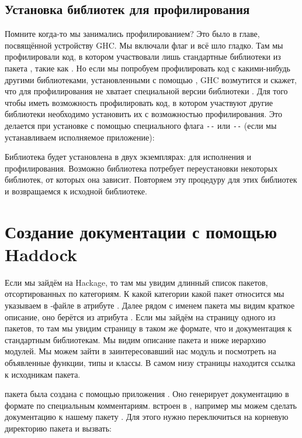 \subsection{Установка библиотек для профилирования}

Помните когда-то мы занимались профилированием? 
Это было в главе, посвящённой устройству GHC. Мы включали
флаг  и всё шло гладко. Там мы профилировали
код, в котором участвовали лишь стандартные библиотеки
из пакета , такие как . Но если мы 
попробуем профилировать код с какими-нибудь другими
библиотеками, установленными с помощью , 
GHC возмутится и скажет, что для профилирования 
не хватает специальной версии библиотеки .
Для того чтобы иметь возможность профилировать код, в котором
участвуют другие библиотеки необходимо установить их
с возможностью профилирования. Это делается при установке
с помощью специального флага \verb!--!
или \verb!--! (если мы устанавливаем 
исполняемое приложение):


Библиотека будет установлена в двух экземплярах:
для исполнения и профилирования.
Возможно библиотека  потребует переустановки
некоторых библиотек, от которых она зависит. Повторяем
эту процедуру для этих библиотек и возвращаемся к 
исходной библиотеке. 

\section{Создание документации с помощью Haddock}

Если мы зайдём на Hackage, то там мы увидим длинный
список пакетов, отсортированных по категориям. 
К какой категории какой пакет относится мы указываем
в -файле в атрибуте . Далее рядом 
с именем пакета
мы видим краткое описание, оно берётся из атрибута . 
Если мы зайдём 
на страницу одного из пакетов, то там мы увидим
страницу в таком же формате, что и документация
к стандартным библиотекам. Мы видим описание пакета
и ниже иерархию модулей. Мы можем зайти в заинтересовавший
нас модуль и посмотреть на объявленные функции, типы 
и классы. В самом низу страницы находится ссылка к
исходникам пакета. 

 пакета была создана с помощью
приложения . Оно генерирует документацию
в формате  по специальным комментариям.
 встроен в , например мы можем
сделать документацию к нашему пакету . 
Для этого нужно переключиться на корневую директорию
пакета и вызвать:


